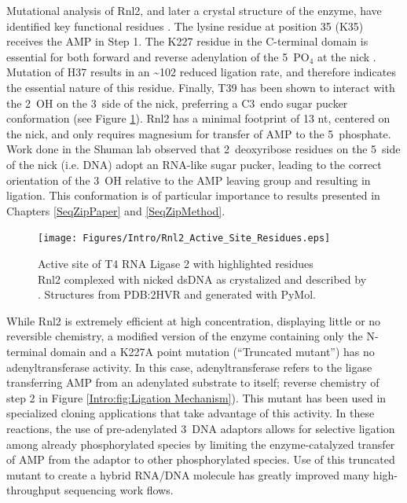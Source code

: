     Mutational analysis of Rnl2, and later a crystal structure of the enzyme, have identified key functional residues \citep{Ho2004, Nandakumar2006,Nandakumar2004a,Yin2003d}. The lysine residue at position 35 (K35) receives the AMP in Step 1. The K227 residue in the C-terminal domain is essential for both forward and reverse adenylation of the 5\textprime~PO$_4$ at the nick \citep{Viollet2011}. Mutation of H37 results in an \textasciitilde102 reduced ligation rate, and therefore indicates the essential nature of this residue. Finally, T39 has been shown to interact with the 2\textprime~OH on the 3\textprime~side of the nick, preferring a C3\textprime~endo sugar pucker conformation (see Figure \ref{Intro:fig:Rnl2 Active Site Residues}). Rnl2 has a minimal footprint of 13 nt, centered on the nick, and only requires magnesium for transfer of AMP to the 5\textprime~phosphate. Work done in the Shuman lab \citep{Nandakumar2006} observed that 2\textprime~deoxyribose residues on the 5\textprime~side of the nick (i.e. DNA) adopt an RNA-like sugar pucker, leading to the correct orientation of the 3\textprime~OH relative to the AMP leaving group and resulting in ligation. This conformation is of particular importance to results presented in Chapters \ref{SeqZipPaper} and \ref{SeqZipMethod}.

    \begin{figure} %
      \centering 
      \texttt{[image: Figures/Intro/Rnl2\_Active\_Site\_Residues.eps]}
      \caption[Active site of T4 RNA Ligase 2 with highlighted residues]
      {
        Active site of T4 RNA Ligase 2 with highlighted residues\\[0.25cm]
        Rnl2 complexed with nicked dsDNA as crystalized and described by \citep{Nandakumar2006}. Structures from PDB:2HVR and generated with PyMol.
        }
      \label{Intro:fig:Rnl2 Active Site Residues}
      \end{figure}

    While Rnl2 is extremely efficient at high concentration, displaying little or no reversible chemistry, a modified version of the enzyme containing only the N-terminal domain and a K227A point mutation (“Truncated mutant”) has no adenyltransferase activity. In this case, adenyltransferase refers to the ligase transferring AMP from an adenylated substrate to itself; reverse chemistry of step 2 in Figure \ref{Intro:fig:Ligation Mechanism}). This mutant has been used in specialized cloning applications \citep{Ghildiyal2008, Hafner2008a, Viollet2011} that take advantage of this activity. In these reactions, the use of pre-adenylated 3\textprime~DNA adaptors allows for selective ligation among already phosphorylated species by limiting the enzyme-catalyzed transfer of AMP from the adaptor to other phosphorylated species. Use of this truncated mutant to create a hybrid RNA/DNA molecule has greatly improved many high-throughput sequencing work flows.

